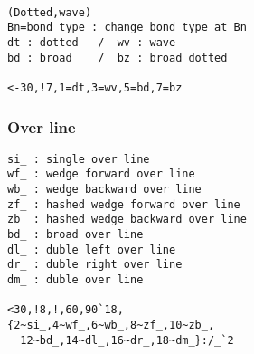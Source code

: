 \documentclass[a4paper]{article}
\begin{document}
\vspace{-3mm}%
%
%
%
%
\begin{verbatim}

(Dotted,wave)
Bn=bond type : change bond type at Bn
dt : dotted   /  wv : wave
bd : broad    /  bz : broad dotted 

<-30,!7,1=dt,3=wv,5=bd,7=bz
\end{verbatim}
\vspace{-3mm}%
\subsubsection{Over line}
%
%
%
%
%
%
%
%
%
\begin{verbatim}
si_ : single over line 
wf_ : wedge forward over line 
wb_ : wedge backward over line 
zf_ : hashed wedge forward over line 
zb_ : hashed wedge backward over line 
bd_ : broad over line 
dl_ : duble left over line 
dr_ : duble right over line 
dm_ : duble over line 

<30,!8,!,60,90`18,
{2~si_,4~wf_,6~wb_,8~zf_,10~zb_,
  12~bd_,14~dl_,16~dr_,18~dm_}:/_`2
\end{verbatim}
\end{document}
